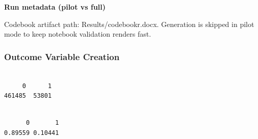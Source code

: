 \documentclass[
  11pt,
  letterpaper,
  DIV=11,
  numbers=noendperiod]{scrartcl}
\begin{document}
\begin{landscape}

\begin{center}\textbf{Run metadata (pilot vs full)}\end{center}

\begin{table}[!h]
\centering\begingroup\fontsize{7}{9}\selectfont

\endgroup{}
\end{table}

\begin{table}[!h]
\centering\begingroup\fontsize{7}{9}\selectfont

\endgroup{}
\end{table}

\end{landscape}

Codebook artifact path: Results/codebookr.docx. Generation is skipped in
pilot mode to keep notebook validation renders fast.

\subsubsection{Outcome Variable
Creation}\label{outcome-variable-creation}

\begin{verbatim}

     0      1 
461485  53801 
\end{verbatim}

\begin{verbatim}

      0       1 
0.89559 0.10441 
\end{verbatim}
\end{document}
